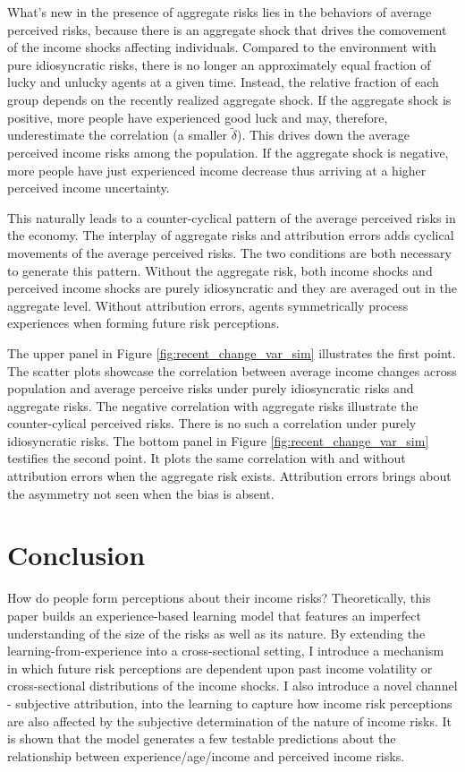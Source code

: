 \documentclass[12pt,notitlepage,onecolumn,aps,pra]{article}
\begin{document}
What's new in the presence of aggregate risks lies in the behaviors of
average perceived risks, because there is an aggregate shock that drives
the comovement of the income shocks affecting individuals. Compared to
the environment with pure idiosyncratic risks, there is no longer an
approximately equal fraction of lucky and unlucky agents at a given
time. Instead, the relative fraction of each group depends on the
recently realized aggregate shock. If the aggregate shock is positive,
more people have experienced good luck and may, therefore, underestimate
the correlation (a smaller \(\tilde \delta\)). This drives down the
average perceived income risks among the population. If the aggregate
shock is negative, more people have just experienced income decrease
thus arriving at a higher perceived income uncertainty.

This naturally leads to a counter-cyclical pattern of the average
perceived risks in the economy. The interplay of aggregate risks and
attribution errors adds cyclical movements of the average perceived
risks. The two conditions are both necessary to generate this pattern.
Without the aggregate risk, both income shocks and perceived income
shocks are purely idiosyncratic and they are averaged out in the
aggregate level. Without attribution errors, agents symmetrically
process experiences when forming future risk perceptions.

The upper panel in Figure \ref{fig:recent_change_var_sim} illustrates
the first point. The scatter plots showcase the correlation between
average income changes across population and average perceive risks
under purely idiosyncratic risks and aggregate risks. The negative
correlation with aggregate risks illustrate the counter-cylical
perceived risks. There is no such a correlation under purely
idiosyncratic risks. The bottom panel in Figure
\ref{fig:recent_change_var_sim} testifies the second point. It plots the
same correlation with and without attribution errors when the aggregate
risk exists. Attribution errors brings about the asymmetry not seen when
the bias is absent.



    \hypertarget{conclusion}{%
\section{Conclusion}\label{conclusion}}

How do people form perceptions about their income risks? Theoretically,
this paper builds an experience-based learning model that features an
imperfect understanding of the size of the risks as well as its nature.
By extending the learning-from-experience into a cross-sectional
setting, I introduce a mechanism in which future risk perceptions are
dependent upon past income volatility or cross-sectional distributions
of the income shocks. I also introduce a novel channel - subjective
attribution, into the learning to capture how income risk perceptions
are also affected by the subjective determination of the nature of
income risks. It is shown that the model generates a few testable
predictions about the relationship between experience/age/income and
perceived income risks.
\end{document}
